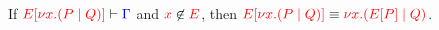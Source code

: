\begin{lemmaB}\label{thm:cp-display-cut-2}
  If $\seq[{ \cpPlug{E}{\cpCut{x}{P}{Q}} }]{ \Gamma }$ and $\notFreeIn{x}{E}$,
  then 
  $\tm{\cpPlug{E}{\cpCut{x}{P}{Q}}} \equiv \tm{\cpCut{x}{\cpPlug{E}{P}}{Q}}$. 
\end{lemmaB}
